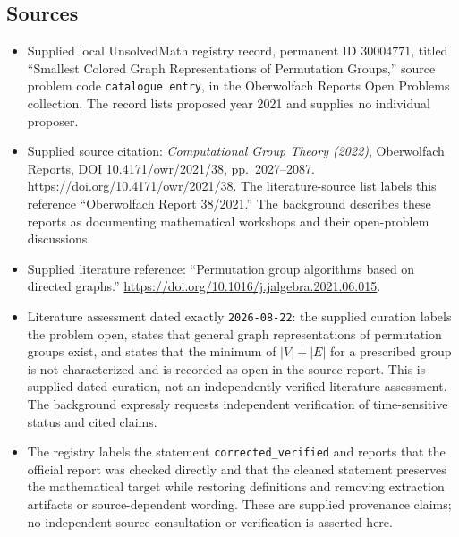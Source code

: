 \documentclass[11pt]{article}
\begin{document}
\subsection{Sources}
\begin{itemize}
\item Supplied local UnsolvedMath registry record, permanent ID \(30004771\), titled ``Smallest Colored Graph Representations of Permutation Groups,'' source problem code \texttt{catalogue entry}, in the Oberwolfach Reports Open Problems collection. The record lists proposed year 2021 and supplies no individual proposer.
\item Supplied source citation: \emph{Computational Group Theory (2022)}, Oberwolfach Reports, DOI 10.4171/owr/2021/38, pp.\ 2027--2087. \url{https://doi.org/10.4171/owr/2021/38}. The literature-source list labels this reference ``Oberwolfach Report 38/2021.'' The background describes these reports as documenting mathematical workshops and their open-problem discussions.
\item Supplied literature reference: ``Permutation group algorithms based on directed graphs.'' \url{https://doi.org/10.1016/j.jalgebra.2021.06.015}.
\item Literature assessment dated exactly \texttt{2026-08-22}: the supplied curation labels the problem open, states that general graph representations of permutation groups exist, and states that the minimum of \(|V|+|E|\) for a prescribed group is not characterized and is recorded as open in the source report. This is supplied dated curation, not an independently verified literature assessment. The background expressly requests independent verification of time-sensitive status and cited claims.
\item The registry labels the statement \texttt{corrected\_verified} and reports that the official report was checked directly and that the cleaned statement preserves the mathematical target while restoring definitions and removing extraction artifacts or source-dependent wording. These are supplied provenance claims; no independent source consultation or verification is asserted here.
\end{itemize}
\end{document}
